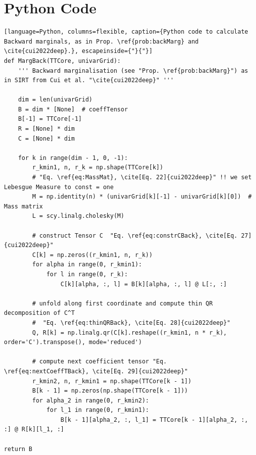 \section{Python Code}

\begin{lstlisting}[language=Python, columns=flexible, caption={Python code to calculate Backward marginals, as in Prop. \ref{prob:backMarg} and \cite{cui2022deep}.}, escapeinside={"}{"}]
def MargBack(TTCore, univarGrid):
	''' Backward marginalisation (see "Prop. \ref{prob:backMarg}") as in SIRT from Cui et al. "\cite{cui2022deep}" '''
	
	dim = len(univarGrid)
	B = dim * [None]  # coeffTensor
	B[-1] = TTCore[-1]
	R = [None] * dim
	C = [None] * dim
	
	for k in range(dim - 1, 0, -1):
		r_kmin1, n, r_k = np.shape(TTCore[k])
		# "Eq. \ref{eq:MassMat}, \cite[Eq. 22]{cui2022deep}" !! we set Lebesgue Measure to const = one
		M = np.identity(n) * (univarGrid[k][-1] - univarGrid[k][0])  # Mass matrix
		L = scy.linalg.cholesky(M)
		
		# construct Tensor C  "Eq. \ref{eq:constrCBack}, \cite[Eq. 27]{cui2022deep}"
		C[k] = np.zeros((r_kmin1, n, r_k))
		for alpha in range(0, r_kmin1):
			for l in range(0, r_k):
				C[k][alpha, :, l] = B[k][alpha, :, l] @ L[:, :]
		
		# unfold along first coordinate and compute thin QR decomposition of C^T
		#  "Eq. \ref{eq:thinQRBack}, \cite[Eq. 28]{cui2022deep}"
		Q, R[k] = np.linalg.qr(C[k].reshape((r_kmin1, n * r_k), order='C').transpose(), mode='reduced')
		
		# compute next coefficient tensor "Eq. \ref{eq:nextCoeffTBack}, \cite[Eq. 29]{cui2022deep}"
		r_kmin2, n, r_kmin1 = np.shape(TTCore[k - 1])
		B[k - 1] = np.zeros(np.shape(TTCore[k - 1]))
		for alpha_2 in range(0, r_kmin2):
			for l_1 in range(0, r_kmin1):
				B[k - 1][alpha_2, :, l_1] = TTCore[k - 1][alpha_2, :, :] @ R[k][l_1, :]

return B

\end{lstlisting}
\clearpage
